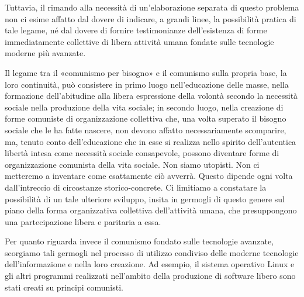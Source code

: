 \documentclass[../main]{subfiles}
\begin{document}
Tuttavia, il rimando alla necessità di un'elaborazione separata di questo problema non ci esime affatto dal dovere di indicare, a grandi linee, la possibilità pratica di tale legame, né dal dovere di fornire testimonianze dell'esistenza di forme immediatamente collettive di libera attività umana fondate sulle tecnologie moderne più avanzate.

Il legame tra il «comunismo per bisogno» e il comunismo sulla propria base, la loro continuità, può consistere in primo luogo nell'educazione delle masse, nella formazione dell'abitudine alla libera espressione della volontà secondo la necessità sociale nella produzione della vita sociale; in secondo luogo, nella creazione di forme comuniste di organizzazione collettiva che, una volta superato il bisogno sociale che le ha fatte nascere, non devono affatto necessariamente scomparire, ma, tenuto conto dell'educazione che in esse si realizza nello spirito dell'autentica libertà intesa come necessità sociale consapevole, possono diventare forme di organizzazione comunista della vita sociale. Non siamo utopisti. Non ci metteremo a inventare come esattamente ciò avverrà. Questo dipende ogni volta dall'intreccio di circostanze storico-concrete. Ci limitiamo a constatare la possibilità di un tale ulteriore sviluppo, insita in germogli di questo genere sul piano della forma organizzativa collettiva dell'attività umana, che presuppongono una partecipazione libera e paritaria a essa.

Per quanto riguarda invece il comunismo fondato sulle tecnologie avanzate, scorgiamo tali germogli nel processo di utilizzo condiviso delle moderne tecnologie dell'informazione e nella loro creazione. Ad esempio, il sistema operativo Linux e gli altri programmi realizzati nell'ambito della produzione di software libero sono stati creati su principi comunisti.
\end{document}
